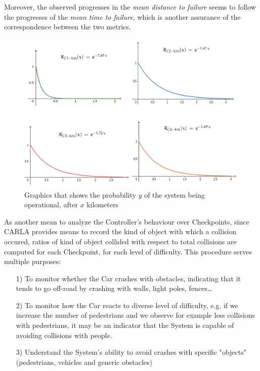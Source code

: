Moreover, the observed progresses in the \textsl{mean distance to failure} seems to follow the progresses of the \textsl{mean time to failure}, which is another assurance of the correspondence between the two metrics.

\begin{figure}[h!]
	\includegraphics[width=\textwidth]{img/reliability-meters-comparison.png}
	\caption{Graphics that shows the probability $y$ of the system being operational, after $x$ kilometers}
\end{figure}

As another mean to analyze the Controller's behaviour over Checkpoints, since CARLA provides means to record the kind of object with which a collision occured, ratios of kind of object collided with respect to total collisions are computed for each Checkpoint, for each level of difficulty.
This procedure serves multiple purposes:

\begin{itemize}
	\item[1)] To monitor whether the Car crashes with obstacles, indicating that it tends to go off-road by crashing with walls, light poles, fences\dots
	\item[2)] To monitor how the Car reacts to diverse level of difficulty, e.g. if we increase the number of pedestrians and we observe for example less collisions with pedestrians, it may be an indicator that the System is capable of avoiding collisions with people.
	\item[3)] Understand the System's ability to avoid crashes with specific "objects" (pedestrians, vehicles and generic obstacles)
\end{itemize}

